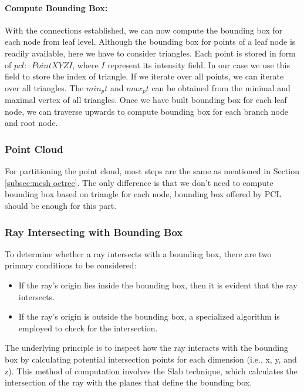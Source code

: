 \documentclass[11pt, a4paper,oneside,chapterprefix=false]{scrbook}
\begin{document}
\paragraph{Compute Bounding Box:}  With the connections established, we can now compute the bounding box for each node from leaf level. Although the bounding box for points of a leaf node is readily available, here we have to consider triangles. Each point is stored in form of $pcl::PointXYZI$, where $I$ represent its intensity field. In our case we use this field to store the index of triangle. If we iterate over all points, we can iterate over all triangles. The $min_pt$ and $max_pt$ can be obtained from the minimal and maximal vertex of all triangles. Once we have built bounding box for each leaf node, we can traverse upwards to compute bounding box for each branch node and root node. 

\subsubsection{Point Cloud}

For partitioning the point cloud, most steps are the same as mentioned in Section \ref{subsec:mesh octree}. The only difference is that we don't need to compute bounding box based on triangle for each node, bounding box offered by PCL should be enough for this part.

\subsubsection{Ray Intersecting with Bounding Box}

To determine whether a ray intersects with a bounding box, there are two primary conditions to be considered:

\begin{itemize}
    \item If the ray's origin lies inside the bounding box, then it is evident that the ray intersects.
    \item If the ray's origin is outside the bounding box, a specialized algorithm is employed to check for the intersection.
\end{itemize}

The underlying principle is to inspect how the ray interacts with the bounding box by calculating potential intersection points for each dimension (i.e., x, y, and z). This method of computation involves the Slab technique, which calculates the intersection of the ray with the planes that define the bounding box.
\end{document}
